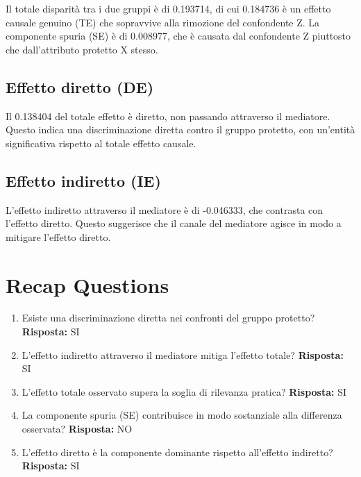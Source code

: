 \documentclass[11pt]{article}
\begin{document}
Il totale disparità tra i due gruppi è di 0.193714, di cui 0.184736 è un effetto causale genuino (TE) che sopravvive alla rimozione del confondente Z. La componente spuria (SE) è di 0.008977, che è causata dal confondente Z piuttosto che dall'attributo protetto X stesso.

\subsection{Effetto diretto (DE)}

Il 0.138404 del totale effetto è diretto, non passando attraverso il mediatore. Questo indica una discriminazione diretta contro il gruppo protetto, con un'entità significativa rispetto al totale effetto causale.

\subsection{Effetto indiretto (IE)}

L'effetto indiretto attraverso il mediatore è di -0.046333, che contrasta con l'effetto diretto. Questo suggerisce che il canale del mediatore agisce in modo a mitigare l'effetto diretto.

\section{Recap Questions}

\begin{enumerate}
\item Esiste una discriminazione diretta nei confronti del gruppo protetto? \textbf{Risposta:} SI
\item L'effetto indiretto attraverso il mediatore mitiga l'effetto totale? \textbf{Risposta:} SI
\item L'effetto totale osservato supera la soglia di rilevanza pratica? \textbf{Risposta:} SI
\item La componente spuria (SE) contribuisce in modo sostanziale alla differenza osservata? \textbf{Risposta:} NO
\item L'effetto diretto è la componente dominante rispetto all'effetto indiretto? \textbf{Risposta:} SI
\end{enumerate}
\end{document}
